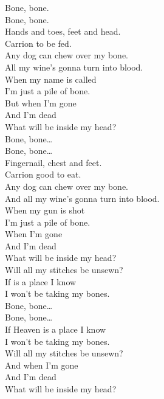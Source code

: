 


Bone, bone. \\
Bone, bone. \\

Hands and toes, feet and head. \\
Carrion to be fed. \\
Any dog can chew over my bone. \\
All my wine's gonna turn into blood. \\
When my name is called \\
I'm just a pile of bone. \\

But when I'm gone \\
And I'm dead \\
What will be inside my head? \\

Bone, bone… \\
Bone, bone… \\

Fingernail, chest and feet. \\
Carrion good to eat. \\
Any dog can chew over my bone. \\
And all my wine's gonna turn into blood. \\
When my gun is shot \\
I'm just a pile of bone. \\

When I'm gone \\
And I'm dead \\
What will be inside my head? \\
Will all my stitches be unsewn? \\
If  is a place I know \\
I won't be taking my bones. \\

Bone, bone… \\
Bone, bone… \\

If Heaven is a place I know \\
I won't be taking my bones. \\
Will all my stitches be unsewn? \\
And when I'm gone \\
And I'm dead \\
What will be inside my head? \\

